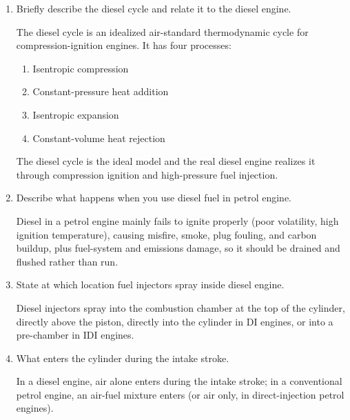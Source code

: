 \begin{enumerate}
	\item Briefly describe the diesel cycle and relate it to the diesel engine.

	      The diesel cycle is an idealized air-standard thermodynamic cycle for compression-ignition engines. It has four processes:

	      \begin{enumerate}

		      \item Isentropic compression
		      \item Constant-pressure heat addition
		      \item Isentropic expansion
		      \item Constant-volume heat rejection

	      \end{enumerate}

	      The diesel cycle is the ideal model and the real diesel engine realizes it through compression ignition and high-pressure fuel injection.

	\item Describe what happens when you use diesel fuel in petrol engine.

	      Diesel in a petrol engine mainly fails to ignite properly (poor volatility, high ignition temperature), causing misfire, smoke, plug fouling, and carbon buildup, plus fuel-system and emissions damage, so it should be drained and flushed rather than run.

	\item State at which location fuel injectors spray inside diesel engine.

	      Diesel injectors spray into the combustion chamber at the top of the cylinder, directly above the piston, directly into the cylinder in DI engines, or into a pre-chamber in IDI engines.

	\item What enters the cylinder during the intake stroke.

	      In a diesel engine, air alone enters during the intake stroke; in a conventional petrol engine, an air-fuel mixture enters (or air only, in direct-injection petrol engines).

\end{enumerate}
